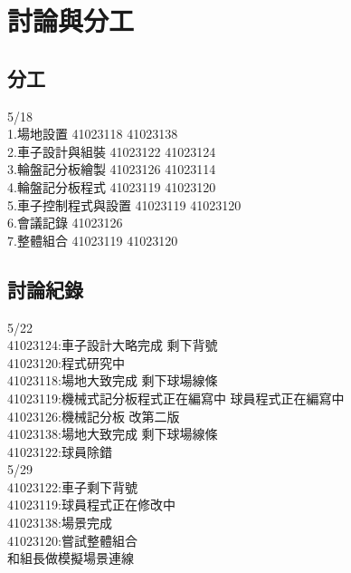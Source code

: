 \chapter{討論與分工}
\renewcommand{\baselinestretch}{10.0} %
\setcounter{page}{1}  %
\fontsize{14pt}{2.5pt}\sectionef
\section{分工}


5/18\\
1.場地設置 41023118 41023138\\
2.車子設計與組裝 41023122 41023124\\
3.輪盤記分板繪製 41023126 41023114\\
4.輪盤記分板程式 41023119 41023120\\
5.車子控制程式與設置 41023119 41023120\\
6.會議記錄 41023126\\
7.整體組合 41023119 41023120


\section{討論紀錄}

5/22 \\
41023124:車子設計大略完成 剩下背號\\
41023120:程式研究中\\
41023118:場地大致完成 剩下球場線條\\
41023119:機械式記分板程式正在編寫中 球員程式正在編寫中\\
41023126:機械記分板 改第二版\\
41023138:場地大致完成 剩下球場線條\\
41023122:球員除錯\\
5/29\\
41023122:車子剩下背號\\
41023119:球員程式正在修改中\\
41023138:場景完成\\
41023120:嘗試整體組合\\
和組長做模擬場景連線
\newpage
